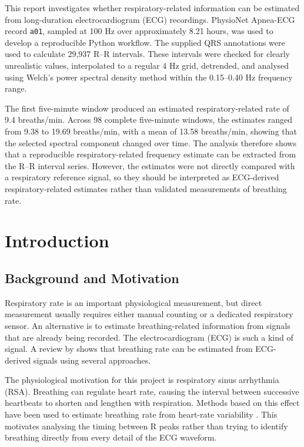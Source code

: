 \documentclass[a4paper,10.5pt,oneside]{report}
\begin{document}
This report investigates whether respiratory-related information can be estimated from long-duration electrocardiogram (ECG) recordings. PhysioNet Apnea-ECG record \texttt{a01}, sampled at 100 Hz over approximately 8.21 hours, was used to develop a reproducible Python workflow. The supplied QRS annotations were used to calculate 29,937 R--R intervals. These intervals were checked for clearly unrealistic values, interpolated to a regular 4 Hz grid, detrended, and analysed using Welch's power spectral density method within the 0.15--0.40 Hz frequency range.

The first five-minute window produced an estimated respiratory-related rate of 9.4 breaths/min. Across 98 complete five-minute windows, the estimates ranged from 9.38 to 19.69 breaths/min, with a mean of 13.58 breaths/min, showing that the selected spectral component changed over time. The analysis therefore shows that a reproducible respiratory-related frequency estimate can be extracted from the R--R interval series. However, the estimates were not directly compared with a respiratory reference signal, so they should be interpreted as ECG-derived respiratory-related estimates rather than validated measurements of breathing rate.

\clearpage
\tableofcontents
\clearpage
{}

\chapter{Introduction}

\section{Background and Motivation}

Respiratory rate is an important physiological measurement, but direct measurement usually requires either manual counting or a dedicated respiratory sensor. An alternative is to estimate breathing-related information from signals that are already being recorded. The electrocardiogram (ECG) is such a kind of signal. A review by \citet{charlton2018} shows that breathing rate can be estimated from ECG-derived signals using several approaches.

The physiological motivation for this project is respiratory sinus arrhythmia (RSA). Breathing can regulate heart rate, causing the interval between successive heartbeats to shorten and lengthen with respiration. Methods based on this effect have been used to estimate breathing rate from heart-rate variability \citep{schaefer2008}. This motivates analysing the timing between R peaks rather than trying to identify breathing directly from every detail of the ECG waveform.
\end{document}

